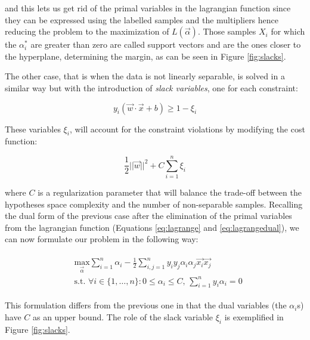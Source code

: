 and this lets us get rid of the primal variables in the lagrangian function since
they can be expressed using the labelled samples and the multipliers hence
reducing the problem to the maximization of $L(\vec{\alpha})$.
Those samples $X_i$ for which the $\alpha^*_i$ are greater than zero are called
support vectors and are the ones closer to the hyperplane, determining the margin,
as can be seen in Figure \ref{fig:slacks}.

The other case, that is when the data is not linearly separable, is solved in a
similar way but with the introduction of \emph{slack variables}, one for each
constraint:

\begin{equation}
    y_i(\vec{w}\cdot\vec{x} + b) \geq 1 - \xi_i
\end{equation}

These variables $\xi_i$, will account for the constraint violations by modifying the cost
function:

\begin{equation}
    \frac{1}{2}||\vec{w}||^2 + C \sum_{i=1}^n \xi_i
\end{equation}

where $C$ is a regularization parameter that will balance the trade-off between
the hypotheses space complexity and the number of non-separable samples.
Recalling the dual form of the previous case after the elimination of the primal
variables from the lagrangian function (Equations \ref{eq:lagrange} and \ref{eq:lagrangedual}),
we can now formulate our problem in the following way:

\begin{gather}
    \begin{aligned}
    & \underset{\vec{\alpha}}{\mathrm{max}} \sum_{i=1}^n \alpha_i - \frac{1}{2} \sum_{i,j=1}^n y_iy_j\alpha_i\alpha_j\vec{x_i}\vec{x_j}\\
    & \text{s.t. } \forall i \in \{1,\dots, n\} : 0 \leq \alpha_i \leq C,\, \sum_{i=1}^n y_i\alpha_i = 0 
    \end{aligned}
\end{gather}

This formulation differs from the previous one in that the dual variables (the $\alpha_i$s)
have $C$ as an upper bound.
The role of the slack variable $\xi_i$ is exemplified in Figure \ref{fig:slacks}.

